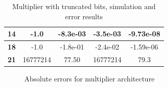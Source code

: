 \documentclass[a4paper]{article}
\begin{document}
\begin{table}[hbtp]
\begin{tabular}{|c|c|c|c|c|}
		\textbf{14}                                                                  & 		-1.0                                                                            & 		-8.3e-03                                                                         & 		-3.5e-03                                                                       & 		-9.73e-08                                                                       \\ \hline
		\textbf{18}                                                                  & 		-1.0                                                                            & 		-1.8e-01                                                                         & 		-2.4e-02                                                                       & 		-1.59e-06                                                                       \\ \hline
		\textbf{21}                                                                  & 		16777214                                                                        & 		77.50                                                                            & 		16777214                                                                       & 		79.3                                                                            \\ \hline
		\end{tabular}
		\caption{Multiplier with truncated bits, simulation and error results}
		\label{tab:mult_trunc_sim}
	\end{table}
	\begin{figure}[H]
		\centering
		\hfill
		\caption{Absolute errors for multiplier architecture}
	\end{figure}
\end{document}
